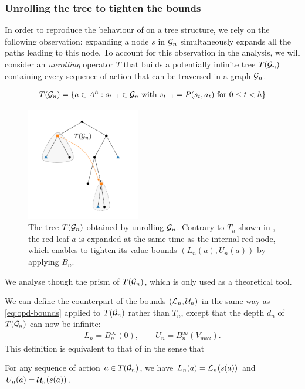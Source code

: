 \subsubsection{Unrolling the tree to tighten the bounds}
\label{sec:unrolling}

In order to reproduce the behaviour of  on a tree structure, we rely on the following observation:  expanding a node $s$ in $\mathcal{G}_n$ simultaneously expands all the paths leading to this node.
To account for this observation in the analysis, we will consider an \emph{unrolling} operator $T$ that builds a potentially infinite tree $T(\mathcal{G}_n)$ containing every sequence of action that can be traversed in a graph $\mathcal{G}_n$.

\begin{equation}
T(\mathcal{G}_n) = \{a\in A^h: s_{t+1} \in \mathcal{G}_n \text{ with } s_{t+1} = P(s_{t}, a_t)\text{ for } 0 \leq t < h\}
\end{equation}

\begin{figure}[htp]
	\centering
	\includegraphics[trim={2.cm 1cm 2.5cm 1cm}, clip, width=0.44\textwidth]{img/gbop/tree_5.pdf}
	\caption{The tree $T(\mathcal{G}_n)$ obtained by unrolling $\mathcal{G}_n$. Contrary to $T_n$ shown in , the red leaf $a$ is expanded at the same time as the internal red node, which enables to tighten its value bounds $(L_n(a), U_n(a))$ by applying $B_n$.}
	\label{fig:unroll}
\end{figure}
We analyse \GBOPD though the prism of $T(\mathcal{G}_n)$, which is only used as a theoretical tool. 

We can define the counterpart of the bounds $(\mathcal{L}_n, \mathcal{U}_n)$ in the same way as \eqref{eq:opd-bounds} applied to $T(\mathcal{G}_n)$ rather than $T_n$, except that the depth $d_n$ of $T(\mathcal{G}_n)$ can now be infinite:
\begin{align}
\label{eq:gbop-t-bounds}
L_n = B_n^{\infty}(0), \qquad U_n = B_n^{\infty}(V_{\max}).
\end{align}
This definition is equivalent to that of \GBOPD in the sense that
\begin{lemma}
	\label{lem:equivalence}
	For any sequence of action $a\in T(\mathcal{G}_n)$, we have $L_n(a) = \mathcal{L}_n(s(a))$ and $U_n(a) = \mathcal{U}_n(s(a))$.	
\end{lemma}


